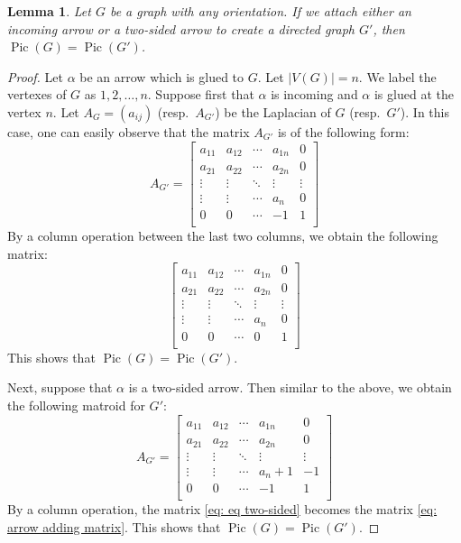 \documentclass[11pt,reqno]{amsart}
\DeclareMathOperator{\Pic}{Pic}
\theoremstyle{definition}
\theoremstyle{plain}
\newtheorem{lem}[mydef]{\textbf{Lemma}}
\begin{document}
\begin{lem}\label{proposition: gluing an arrow proposition}
Let $G$ be a graph with any orientation. If we attach either an incoming arrow or a two-sided  arrow to create a directed graph $G'$, then $\Pic(G)=\Pic(G')$.
\end{lem}	
\begin{proof}
Let $\alpha$ be an arrow which is glued to $G$. Let $|V(G)|=n$. We label the vertexes of $G$ as $1,2,\dots,n$. Suppose first that $\alpha$ is incoming and $\alpha$ is glued at the vertex $n$. Let $A_G=(a_{ij})$ (resp.~$A_{G'}$) be the Laplacian of $G$ (resp.~$G'$). In this case, one can easily observe that the matrix $A_{G'}$ is of the following form:
\begin{equation}
A_{G'}=\left[\begin{array}{ccc|c|c}
	a_{11}&a_{12}&\cdots &a_{1n}&0\\
	a_{21}&a_{22}&\cdots &a_{2n}&0\\
	\vdots & \vdots &\ddots & \vdots & \vdots \\ \hline
		\vdots & \vdots & \cdots&a_n & 0\\ \hline
	0&0&\cdots &-1&1\\
\end{array}\right]
\end{equation}
By a column operation between the last two columns, we obtain the following matrix:
\begin{equation}\label{eq: arrow adding matrix}
	\left[\begin{array}{ccc|c|c}
		a_{11}&a_{12}&\cdots &a_{1n}&0\\
		a_{21}&a_{22}&\cdots &a_{2n}&0\\
		\vdots & \vdots &\ddots & \vdots & \vdots \\ \hline
		\vdots & \vdots & \cdots&a_n & 0\\ \hline
		0&0&\cdots &0&1\\
	\end{array}\right]
\end{equation}
This shows that $\Pic(G)=\Pic(G')$.

Next, suppose that $\alpha$ is a two-sided arrow. Then similar to the above, we obtain the following matroid for $G'$:
\begin{equation}\label{eq: eq two-sided}
	A_{G'}=\left[\begin{array}{ccc|c|c}
		a_{11}&a_{12}&\cdots &a_{1n}&0\\
		a_{21}&a_{22}&\cdots &a_{2n}&0\\
		\vdots & \vdots &\ddots & \vdots & \vdots \\ \hline
		\vdots & \vdots & \cdots&a_n+1 & -1\\ \hline
		0&0&\cdots &-1&1\\
	\end{array}\right]
\end{equation}
By a column operation, the matrix \eqref{eq: eq two-sided} becomes the matrix \eqref{eq: arrow adding matrix}. This shows that $\Pic(G)=\Pic(G')$.
\end{proof}	
		
\end{document}

